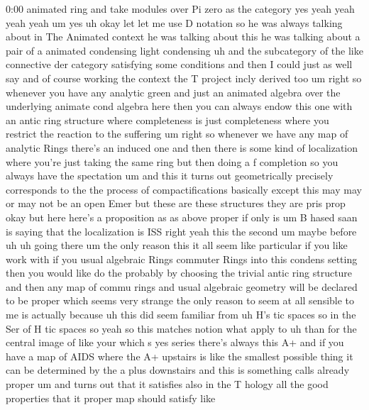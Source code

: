 \begin{unfinished}{0:00}
animated  ring  and  take  modules  over  Pi
zero  as  the  category  yes  yeah  yeah  yeah
yeah
um  yes
uh  okay  let  let  me  use  D  notation  so  he
was  always  talking  about  in  The  Animated
context  he  was  talking  about
this  he  was  talking  about  a  pair  of
a  animated  condensing  light  condensing
uh  and  the  subcategory  of  the  like
connective  der  category  satisfying  some
conditions  and
then  I  could  just  as  well
say  and  of  course  working  the  context
the  T  project  incly  derived
too
um  right  so  whenever  you  have  any
analytic  green  and  just  an  animated
algebra  over  the
underlying  animate  cond  algebra  here
then  you  can  always  endow  this  one  with
an  antic  ring  structure  where
completeness  is  just  completeness  where
you  restrict
the  reaction  to  the  suffering
um  right  so  whenever  we  have  any  map  of
analytic
Rings  there's  an  induced  one  and  then
there  is  some  kind  of
localization  where  you're  just  taking
the  same  ring  but  then  doing  a  f
completion  so  you  always  have  the
spectation  um  and  this  it  turns  out
geometrically  precisely  corresponds  to
the  the  process  of  compactifications
basically  except  this  may  may  or  may  not
be  an  open  Emer  but  these  are  these
structures  they  are  pris
prop  okay  but  here  here's  a
proposition  as  as  above
proper  if  only
is
um
B
hased
saan  is  saying  that  the  localization  is
ISS  right  yeah  this  the
second
um  maybe
before
uh
uh  going  there  um  the  only  reason  this
it  all  seem  like  particular  if  you  like
work  with  if  you  usual  algebraic  Rings
commuter  Rings  into  this  condens  setting
then  you  would  like  do  the  probably  by
choosing  the  trivial  antic  ring
structure  and  then  any  map  of  commu
rings  and  usual  algebraic  geometry  will
be  declared  to  be  proper  which  seems
very  strange  the  only  reason  to  seem  at
all  sensible  to  me  is  actually  because
uh  this  did  seem  familiar  from  uh  H's
tic  spaces  so  in  the  Ser  of  H  tic
spaces  so  yeah  so  this
matches
notion  what  apply
to  uh  than  for  the  central  image  of  like
your  which
s
yes  series  there's  always  this  A+  and  if
you  have  a  map  of  AIDS  where  the  A+
upstairs  is  like  the  smallest  possible
thing  it  can  be  determined  by  the  a  plus
downstairs  and  this  is  something  calls
already  proper
um  and  turns  out  that  it  satisfies  also
in  the  T  hology  all  the  good  properties
that  it  proper  map  should  satisfy  like

\end{unfinished}
